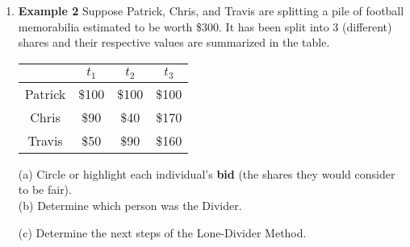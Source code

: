 \documentclass[12pt]{article}
\begin{document}
\begin{enumerate}
\begin{multicols}{2}
(b) Circle or highlight each individual's \textbf{bid} (the shares they would consider to be fair).\\

(c) Determine which person was the Divider.
\end{multicols}
(d) Determine the next steps of the Lone-Divider Method.
\vfill
\item \textbf{Example 2} Suppose Patrick, Chris, and Travis are splitting a pile of football memorabilia estimated to be worth \$300. It has been split into 3 (different) shares and their respective values are summarized in the table.
\begin{multicols}{2}
\begin{tabular}{c||c|c|c}
&$t_1$&$t_2$&$t_3$\\
\hline \hline
Patrick&\$100&\$100&\$100\\
Chris&\$90&\$40&\$170\\
Travis&\$50&\$90&\$160\\
\end{tabular} 

(a) Circle or highlight each individual's \textbf{bid} (the shares they would consider to be fair).\\

(b) Determine which person was the Divider.
\end{multicols}
(c) Determine the next steps of the Lone-Divider Method.
\vfill

\end{enumerate}
\end{document}
